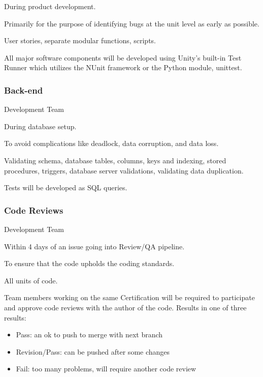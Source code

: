 \documentclass[letterpaper,10pt,english]{sphinxmanual}
\begin{document}
 During product development.

 Primarily for the purpose of identifying bugs at the unit level as early as possible.

 User stories, separate modular functions, scripts.

 All major software components will be developed using Unity’s built-in Test Runner which utilizes the NUnit framework or the Python module, unittest.


\subsubsection{Back-end}
\label{\detokenize{test_plan/strategy:back-end}}
 Development Team

 During database setup.

 To avoid complications like deadlock, data corruption, and data loss.

 Validating schema, database tables, columns, keys and indexing, stored procedures, triggers, database server validations, validating data duplication.

 Tests will be developed as SQL queries.


\subsubsection{Code Reviews}
\label{\detokenize{test_plan/strategy:code-reviews}}
 Development Team

 Within 4 days of an issue going into Review/QA pipeline.

 To ensure that the code upholds the coding standards.

 All units of code.

 Team members working on the same Certification will be required to participate and approve code reviews with the author of the code. Results in one of three results:
\begin{itemize}
\item {} 
Pass: an ok to push to merge with next branch

\item {} 
Revision/Pass: can be pushed after some changes

\item {} 
Fail: too many problems, will require another code review

\end{itemize}
\end{document}

